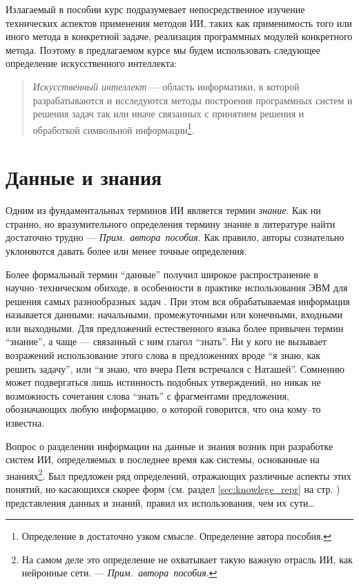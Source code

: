 \documentclass[12pt, openany, twoside]{book} %
\def\AR{{\em Прим.~автора~пособия}}
\begin{document}
Излагаемый в пособии курс подразумевает непосредственное изучение технических аспектов применения методов ИИ, таких как применимость того или иного метода в конкретной задаче, реализация программных модулей конкретного метода. Поэтому в предлагаемом курсе мы будем использовать следующее определение искусственного интеллекта:
\begin{quote}{\em
Искусственный интеллект} --- область информатики, в которой разрабатываются и исследуются методы построения программных систем и решения задач так или иначе связанных с принятием решения и обработкой символьной информации\footnote{Определение в достаточно узком смысле. Определение автора пособия.}.
\end{quote}

\section{Данные и знания}

Одним из фундаментальных терминов ИИ является термин {\em знание}. Как ни странно, но вразумительного определения термину знание в литературе най\-ти достаточно трудно --- \AR. Как правило, авторы сознательно уклоняются давать более или менее точные определения.

Более формальный термин ``данные'' получил широкое распространение в научно--техническом обиходе, в особенности в практике использования ЭВМ для решения самых разнообразных задач \cite{AIDictionary}. При этом вся обрабатываемая информация называется данными: началь\-ны\-ми, промежуточными или конечными, входными или выходными. Для предложений естественного языка более привычен термин ``знание'', а чаще --- связанный с ним глагол ``знать''. Ни у кого не вызывает возражений использование этого слова в предложениях вроде ``я знаю, как решить задачу'', или ``я знаю, что вчера Петя встречался с Наташей''. Сомнению может подвергаться лишь истинность подобных утверждений, но никак не возможность сочетания слова ``знать'' с фрагментами предложения, обозначающих любую информацию, о которой говорится, что она кому--то известна.

Вопрос о разделении информации на данные и знания возник при разработке систем ИИ, определяемых в последнее время как системы, основанные на знаниях\footnote{На самом деле это определение не охватывает такую важную отрасль ИИ, как нейронные сети.  --- \AR.}. Был предложен ряд определений, отражающих различные аспекты этих понятий, но касающихся скорее форм (см. раздел \ref{sec:knowlege_repr} на стр. \pageref{sec:knowlege_repr}) представления данных и знаний, правил их использования, чем их сути\ldots
\end{document}
